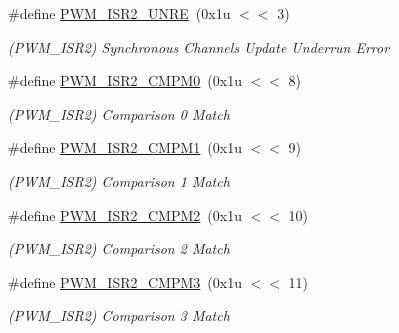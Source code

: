 \begin{DoxyCompactItemize}
\mbox{\label{group__SAMS70__PWM_ga4f891ac664df435c654fac36302a55e4}} 
\#define \mbox{\hyperlink{group__SAMS70__PWM_ga4f891ac664df435c654fac36302a55e4}{P\+W\+M\+\_\+\+I\+S\+R2\+\_\+\+U\+N\+RE}}~(0x1u $<$$<$ 3)
\begin{DoxyCompactList}\small\item\em (P\+W\+M\+\_\+\+I\+S\+R2) Synchronous Channels Update Underrun Error \end{DoxyCompactList}\item 
\mbox{\label{group__SAMS70__PWM_ga5045773e8d5d53f330ed573b419623e4}} 
\#define \mbox{\hyperlink{group__SAMS70__PWM_ga5045773e8d5d53f330ed573b419623e4}{P\+W\+M\+\_\+\+I\+S\+R2\+\_\+\+C\+M\+P\+M0}}~(0x1u $<$$<$ 8)
\begin{DoxyCompactList}\small\item\em (P\+W\+M\+\_\+\+I\+S\+R2) Comparison 0 Match \end{DoxyCompactList}\item 
\mbox{\label{group__SAMS70__PWM_gaf3e6a85fe528741a0a1c32a8a8bb3755}} 
\#define \mbox{\hyperlink{group__SAMS70__PWM_gaf3e6a85fe528741a0a1c32a8a8bb3755}{P\+W\+M\+\_\+\+I\+S\+R2\+\_\+\+C\+M\+P\+M1}}~(0x1u $<$$<$ 9)
\begin{DoxyCompactList}\small\item\em (P\+W\+M\+\_\+\+I\+S\+R2) Comparison 1 Match \end{DoxyCompactList}\item 
\mbox{\label{group__SAMS70__PWM_ga26aa7d6e543c00c9b4c5e5ba6c89a20e}} 
\#define \mbox{\hyperlink{group__SAMS70__PWM_ga26aa7d6e543c00c9b4c5e5ba6c89a20e}{P\+W\+M\+\_\+\+I\+S\+R2\+\_\+\+C\+M\+P\+M2}}~(0x1u $<$$<$ 10)
\begin{DoxyCompactList}\small\item\em (P\+W\+M\+\_\+\+I\+S\+R2) Comparison 2 Match \end{DoxyCompactList}\item 
\mbox{\label{group__SAMS70__PWM_gae70463799be2768ca584ccdb80f89257}} 
\#define \mbox{\hyperlink{group__SAMS70__PWM_gae70463799be2768ca584ccdb80f89257}{P\+W\+M\+\_\+\+I\+S\+R2\+\_\+\+C\+M\+P\+M3}}~(0x1u $<$$<$ 11)
\begin{DoxyCompactList}\small\item\em (P\+W\+M\+\_\+\+I\+S\+R2) Comparison 3 Match \end{DoxyCompactList}\item 
$$
\end{DoxyCompactItemize}
